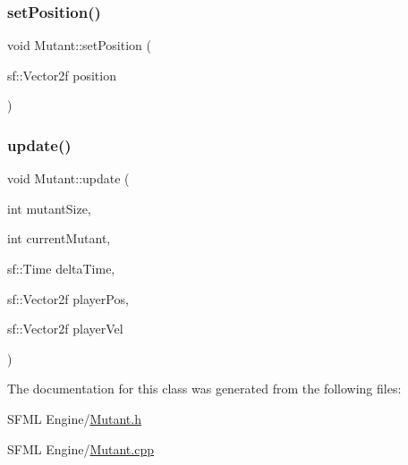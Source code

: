 \mbox{\label{class_mutant_a10a34b2ddc9177b0da17fa8bc77d48c7}} 
\subsubsection{\texorpdfstring{set\+Position()}{setPosition()}}
{\footnotesize\ttfamily void Mutant\+::set\+Position (\begin{DoxyParamCaption}\item[{sf\+::\+Vector2f}]{position }\end{DoxyParamCaption})}

\mbox{\label{class_mutant_aa334f3574bc0a367e0cc722a900b35da}} 
\subsubsection{\texorpdfstring{update()}{update()}}
{\footnotesize\ttfamily void Mutant\+::update (\begin{DoxyParamCaption}\item[{int}]{mutant\+Size,  }\item[{int}]{current\+Mutant,  }\item[{sf\+::\+Time}]{delta\+Time,  }\item[{sf\+::\+Vector2f}]{player\+Pos,  }\item[{sf\+::\+Vector2f}]{player\+Vel }\end{DoxyParamCaption})}



The documentation for this class was generated from the following files\+:\begin{DoxyCompactItemize}
\item 
S\+F\+M\+L Engine/\hyperlink{_mutant_8h}{Mutant.\+h}\item 
S\+F\+M\+L Engine/\hyperlink{_mutant_8cpp}{Mutant.\+cpp}\end{DoxyCompactItemize}
